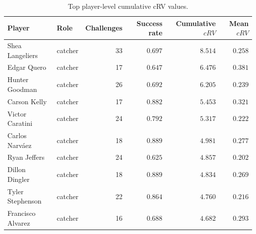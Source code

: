 \begin{table}[h]
\centering
\caption{Top player-level cumulative cRV values.}
\label{tab:leaderboard}
\small
\begin{tabular}{llrrrr}
\toprule
Player & Role & Challenges & Success rate & Cumulative $cRV$ & Mean $cRV$ \\
\midrule
Shea Langeliers & catcher & 33 & $0.697$ & $8.514$ & $0.258$ \\
Edgar Quero & catcher & 17 & $0.647$ & $6.476$ & $0.381$ \\
Hunter Goodman & catcher & 26 & $0.692$ & $6.205$ & $0.239$ \\
Carson Kelly & catcher & 17 & $0.882$ & $5.453$ & $0.321$ \\
Victor Caratini & catcher & 24 & $0.792$ & $5.317$ & $0.222$ \\
Carlos Narváez & catcher & 18 & $0.889$ & $4.981$ & $0.277$ \\
Ryan Jeffers & catcher & 24 & $0.625$ & $4.857$ & $0.202$ \\
Dillon Dingler & catcher & 18 & $0.889$ & $4.834$ & $0.269$ \\
Tyler Stephenson & catcher & 22 & $0.864$ & $4.760$ & $0.216$ \\
Francisco Alvarez & catcher & 16 & $0.688$ & $4.682$ & $0.293$ \\
\bottomrule
\end{tabular}
\end{table}
